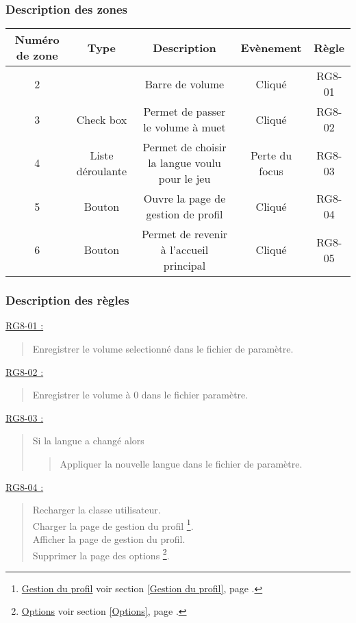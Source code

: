 \documentclass{report}
\begin{document}
		\subsubsection{Description des zones}
		
			\begin{tabular}{|c|c|c|c|c|} \hline
				Numéro de zone & Type  & Description & Evènement &	Règle \\\hline
				2 & & Barre de volume & Cliqué & RG8-01 \\\hline
				3 & Check box & Permet de passer le volume à muet & Cliqué & RG8-02 \\\hline
				4 & Liste déroulante & Permet de choisir la langue voulu pour le jeu & Perte du focus & RG8-03 \\\hline 
				5 & Bouton & Ouvre la page de gestion de profil & Cliqué & RG8-04 \\\hline 
				6 & Bouton & Permet de revenir à l'accueil principal & Cliqué & RG8-05 \\\hline
			\end{tabular}
			
		\subsubsection{Description des règles}

			\underline{RG8-01 :}
				\begin{quote}
					Enregistrer le volume selectionné dans le fichier de paramètre.\\
				\end{quote}
				

			\underline{RG8-02 :}
				\begin{quote}
					Enregistrer le volume à 0 dans le fichier paramètre.\\
				\end{quote}
				

			\underline{RG8-03 :}
				\begin{quote}
					Si la langue a changé alors
					\begin{quote}
						Appliquer la nouvelle langue dans le fichier de paramètre.
					\end{quote}
				\end{quote}


			\underline{RG8-04 :}
				\begin{quote}
					Recharger la classe utilisateur.\\
					Charger la page de gestion du profil%
						\footnote[1]{
							\hyperlink{Gestion du profil}{Gestion du profil}
							\og voir section \ref{Gestion du profil}, page \pageref{Gestion du profil}.\fg
						}.\\
					Afficher la page de gestion du profil\footnotemark[1].\\
					Supprimer la page des options%
						\footnote[2]{
							\hyperlink{Options}{Options}
							\og voir section \ref{Options}, page \pageref{Options}.\fg
						}.\\						
				\end{quote}
				
\end{document}
